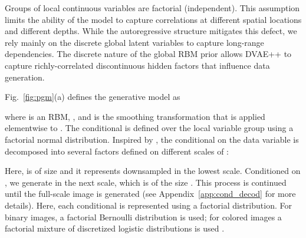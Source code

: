 \documentclass{article}
\begin{document}
Groups of local continuous variables are factorial (independent). This assumption limits the ability of the model to capture correlations at different spatial locations and different depths. While the autoregressive structure mitigates this defect, we rely mainly on the discrete global latent variables to capture long-range dependencies. The discrete nature of the global RBM prior allows DVAE++ to capture richly-correlated discontinuous hidden factors that influence data generation. 

Fig.~\ref{fig:pgm}(a) defines the generative model as

where  is an RBM, , and  is the smoothing transformation that is applied 
elementwise to .
The conditional  is defined over the  local variable
group using a factorial normal distribution. Inspired by \cite{reedParallel2017, denton2015deep}, the conditional on the data variable
 is decomposed into several factors defined on different scales of :

Here,  is of size  and it represents downsampled  in the lowest scale. 
Conditioned on , we generate  in the next scale, which is of the size .
This process is continued until the full-scale image is generated (see Appendix~\ref{app:cond_decod} for more details). Here,
each conditional is represented using a factorial distribution. For binary images, a
factorial Bernoulli distribution is used; for colored images a factorial mixture of
discretized logistic distributions is used \cite{salimans2017pixelcnn++}.
\end{document}
